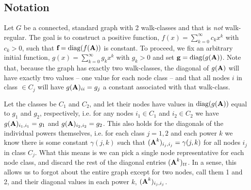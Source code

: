 

\subsection{Notation}

Let $G$ be a connected, standard graph with 2 walk-classes and that is \emph{not} walk-regular.
The goal is to construct a positive function, $f(x) = \sum_{k=0}^{\infty} c_k x^k$ with $c_k > 0 $, such that $\textbf{f} = \operatorname{diag}(f(\textbf{A}))$ is constant.
To proceed, we fix an arbitrary initial function, $g(x) = \sum_{k=0}^{\infty} g_k x^k$ with $g_k > 0 $ and set $\textbf{g} = \operatorname{diag}(g(\textbf{A}))$.
Note that, because the graph has exactly two walk-classes, the diagonal of $g(\textbf{A})$ will have exactly two values -- one value for each node class -- and that all nodes $i$ in class $\in C_j$ will have $g(\textbf{A})_{ii} = g_j$ a constant associated with that walk-class.

Let the classes be $C_1$ and $C_2$, and let their nodes have values in $\operatorname{diag}(g(\textbf{A}))$ equal to $g_1$ and $g_2$, respectively, i.e. for any nodes $i_1 \in C_1$ and $i_2 \in C_2$ we have $g(\textbf{A})_{i_1,i_1} = g_1$ and $g(\textbf{A})_{i_2,i_2} = g_2$.
This also holds for the diagonals of the individual powers themselves, i.e. for each class $j=1,2$ and each power $k$ we know there is some constant $\gamma(j,k)$ such that $(\textbf{A}^k)_{i_j,i_j} = \gamma(j,k)$ for all nodes $i_j$ in class $C_j$.
What this means is we can pick a single node representative for each node class, and discard the rest of the diagonal entries $(\textbf{A}^k)_{tt}$.
In a sense, this allows us to forgot about the entire graph except for two nodes, call them 1 and 2, and their diagonal values in each power $k$, $(\textbf{A}^k)_{i_j,i_j}$.

